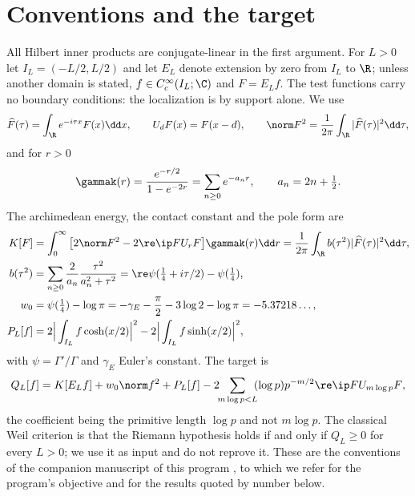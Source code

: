 \section{Conventions and the target}\label{sec:conventions}
All Hilbert inner products are conjugate-linear in the first argument. For
$L>0$ let $I_L=(-L/2,L/2)$ and let $E_L$ denote extension by zero from $I_L$ to
$\R$; unless another domain is stated, $f\in C_c^\infty(I_L;\C)$ and $F=E_Lf$.
The test functions carry no boundary conditions: the localization is by support
alone. We use
\begin{equation}\label{eq:fourier}
 \widehat F(\tau)=\int_\R e^{-i\tau x}F(x)\dd x,\qquad U_dF(x)=F(x-d),
 \qquad \norm F^2=\frac1{2\pi}\int_\R|\widehat F(\tau)|^2\dd\tau,
\end{equation}
and for $r>0$
\begin{equation}\label{eq:gamma-kernel}
 \gammak(r)=\frac{e^{-r/2}}{1-e^{-2r}}=\sum_{n\geq0}e^{-a_nr},
 \qquad a_n=2n+\tfrac12 .
\end{equation}
The archimedean energy, the contact constant and the pole form are
\begin{align}
 K[F]&=\int_0^\infty\big[2\norm F^2-2\re\ip F{U_rF}\big]\gammak(r)\dd r
  =\frac1{2\pi}\int_\R b(\tau^2)|\widehat F(\tau)|^2\dd\tau,
 \label{eq:gamma-energy}\\
 b(\tau^2)&=\sum_{n\geq0}\frac2{a_n}\frac{\tau^2}{a_n^2+\tau^2}
  =\re\psi(\tfrac14+i\tau/2)-\psi(\tfrac14),
 \label{eq:gamma-multiplier}\\
 w_0&=\psi(\tfrac14)-\log\pi=-\gamma_E-\frac\pi2-3\log2-\log\pi
  =-5.37218\ldots,
 \label{eq:contact}\\
 P_L[f]&=2\Big|\int_{I_L}f\cosh(x/2)\Big|^2-2\Big|\int_{I_L}f\sinh(x/2)\Big|^2,
 \label{eq:poles}
\end{align}
with $\psi=\Gamma'/\Gamma$ and $\gamma_E$ Euler's constant. The target is
\begin{equation}\label{eq:target}
 Q_L[f]=K[E_Lf]+w_0\norm f^2+P_L[f]
 -2\!\!\sum_{m\log p<L}\!\!(\log p)p^{-m/2}\re\ip F{U_{m\log p}F},
\end{equation}
the coefficient being the primitive length $\log p$ and not $m\log p$. The
classical Weil criterion is that the Riemann hypothesis holds if and only if
$Q_L\geq0$ for every $L>0$; we use it as input and do not reprove it. These are
the conventions of the companion manuscript of this program
\cite{InverseBulk,Suzuki,CCM}, to which we refer for the program's objective and
for the results quoted by number below.

